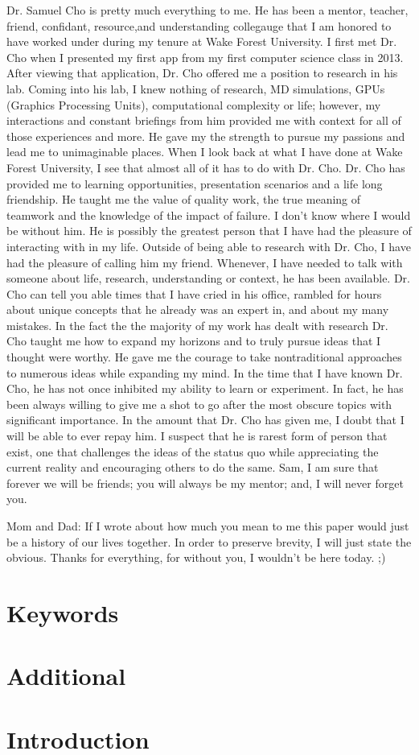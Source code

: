 \documentclass[paper=letter, fontsize=11pt]{scrartcl}
\numberwithin{equation}{section}		%
\numberwithin{figure}{section}			%
\numberwithin{table}{section}				%
\begin{document}
\begin{spacing}{2}
Dr. Samuel Cho is pretty much everything to me. He has been a mentor, teacher, friend, confidant, resource,and understanding collegauge that I am honored to have worked under during my tenure at Wake Forest University. I first met Dr. Cho when I presented my first app from my first computer science class in 2013. After viewing that application, Dr. Cho offered me a position to research in his lab. Coming into his lab, I knew nothing of research, MD simulations, GPUs (Graphics Processing Units), computational complexity or life; however, my interactions and constant briefings from him provided me with context for all of those experiences and more. He gave my the strength to pursue my passions and lead me to unimaginable places. When I look back at what I have done at Wake Forest University, I see that almost all of it has to do with Dr. Cho. Dr. Cho has provided me to learning opportunities, presentation scenarios and a life long friendship. He taught me the value of quality work, the true meaning of teamwork and the knowledge of the impact of failure. I don't know where I would be without him. He is possibly the greatest person that I have had the pleasure of interacting with in my life. Outside of being able to research with Dr. Cho, I have had the pleasure of calling him my friend. Whenever, I have needed to talk with someone about life, research, understanding or context, he has been available. Dr. Cho can tell you able times that I have cried in his office, rambled for hours about unique concepts that he already was an expert in, and about my many mistakes. In the fact the the majority of my work has dealt with research Dr. Cho taught me how to expand my horizons and to truly pursue ideas that I thought were worthy. He gave me the courage to take nontraditional approaches to numerous ideas while expanding my mind. In the time that I have known Dr. Cho, he has not once inhibited my ability to learn or experiment. In fact, he has been always willing to give me a shot to go after the most obscure topics with significant importance. In the amount that Dr. Cho has given me, I doubt that I will be able to ever repay him. I suspect that he is rarest form of person that exist, one that challenges the ideas of the status quo while appreciating the current reality and encouraging others to do the same.  Sam, I am sure that forever we will be friends; you will always be my mentor; and, I will never forget you. 

Mom and Dad: If I wrote about how much you mean to me this paper would just be a history of our lives together. In order to preserve brevity, I will just state the obvious. Thanks for everything, for without you, I wouldn't be here today. ;)

\section{Keywords}
\section{Additional}
\section{Introduction}


\end{spacing}

 
\end{document}
